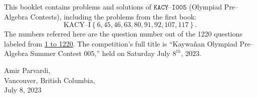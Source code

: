 \documentclass[12pt,a4paper]{memoir}
\theoremstyle{definition}
\begin{document}
		This booklet contains problems and solutions of $\texttt{KACY--I005}$ (Olympiad Pre--Algebra Contests), including the problems from the first book: $$\text{KACY--I}\left\{6,45,46,63,80,91,92,107,117\right\}.$$ The numbers referred here are the question number out of the 1220 questions labeled from \href{https://github.com/parvardi/KACY/blob/main/KACY-VOL-I.pdf}{1 to 1220}. The competition's full title is ``Kaywañan Olympiad Pre--Algebra Summer Contest 005,'' held on Saturday July $8^{th}$, 2023.
%	
\Large
		\begin{flushright}
			Amir Parvardi,\\
			Vancouver, British Columbia,\\
			July 8, 2023
		\end{flushright}
	
\end{document}

